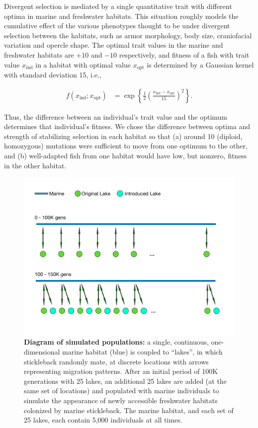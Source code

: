 \documentclass{article}
\begin{document}
Divergent selection is mediated by a single quantitative trait with different optima in marine and freshwater habitats. 
This situation roughly models the cumulative effect of the various phenotypes thought to be under divergent selection between the habitats, such as armor morphology, body size, craniofacial variation and opercle shape.
The optimal trait values in the marine and freshwater habitats are $+10$ and $-10$ respectively, and fitness of a fish with trait value $x_\text{ind}$ in a habitat with optimal value $x_\text{opt}$ is determined by a Gaussian kernel with standard deviation 15, i.e.,

\begin{align*}
    f(x_\text{ind}; x_\text{opt})
    &=
    \exp\left\{
        \frac{1}{2}
            \left(
            \frac{x_\text{ind}-x_\text{opt}}{15}
            \right)^2
        \right\} .
\end{align*}

Thus, the difference between an individual's trait value and the optimum determines that individual's fitness. 
We chose the difference between optima and strength of stabilizing selection in each habitat so that (a) around 10 (diploid, homozygous) mutations were sufficient to move from one optimum to the other, and (b) well-adapted fish from one habitat would have low, but nonzero, fitness in the other habitat.

\begin{figure}
    \begin{center}
          \includegraphics[width=0.8\linewidth]{Final_Plots/GeographyFigure.pdf}
          \caption{
            \textbf{Diagram of simulated populations:}
            a single, continuous, one-dimensional marine habitat (blue)
            is coupled to ``lakes'', in which stickleback randomly mate, at discrete locations with arrows representing migration patterns.
            After an initial period of 100K generations with 25 lakes,
            an additional 25 lakes are added (at the same set of locations) and populated with marine individuals
            to simulate the appearance of newly accessible freshwater habitats colonized by marine stickleback.
            The marine habitat, and each set of 25 lakes, each contain 5,000 individuals at all times.
            }
          \label{fig:Geo}
    \end{center}
\end{figure}
\end{document}
